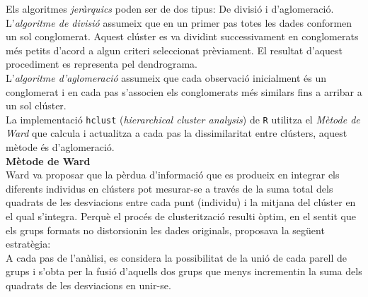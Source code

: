 \documentclass[english]{article}
\begin{document}
Els algoritmes \textit{jeràrquics} poden ser de dos tipus: De divisió i d'aglomeració.
\\

L'\textit{algoritme de divisió} assumeix que en un primer pas totes les dades conformen un sol conglomerat. Aquest clúster es va dividint successivament en conglomerats més petits d'acord a algun criteri seleccionat prèviament. El resultat d'aquest procediment es representa pel dendrograma.
\\

L'\textit{algoritme d'aglomeració} assumeix que cada observació inicialment és un conglomerat i en cada pas s'associen els conglomerats més similars fins a arribar a un sol clúster.
\\

La implementació \texttt{hclust} (\textit{hierarchical cluster analysis}) de \texttt{R} utilitza el \textit{Mètode de Ward} que calcula i actualitza a cada pas la dissimilaritat entre clústers, aquest mètode és d'aglomeració.
\\
\clearpage
\noindent\textbf{Mètode de Ward}
\\

\noindent Ward va proposar que la pèrdua d'informació que es produeix en integrar els diferents individus en clústers pot mesurar-se a través de la suma total dels quadrats de les desviacions entre cada punt (individu) i la mitjana del clúster en el qual s'integra. Perquè el procés de clusterització resulti òptim, en el sentit que els grups formats no distorsionin les dades originals, proposava la següent estratègia:
\\

A cada pas de l'anàlisi, es considera la possibilitat de la unió de cada parell de grups i s'obta per la fusió d'aquells dos grups que menys incrementin la suma dels quadrats de les desviacions en unir-se.
\\
\end{document}
